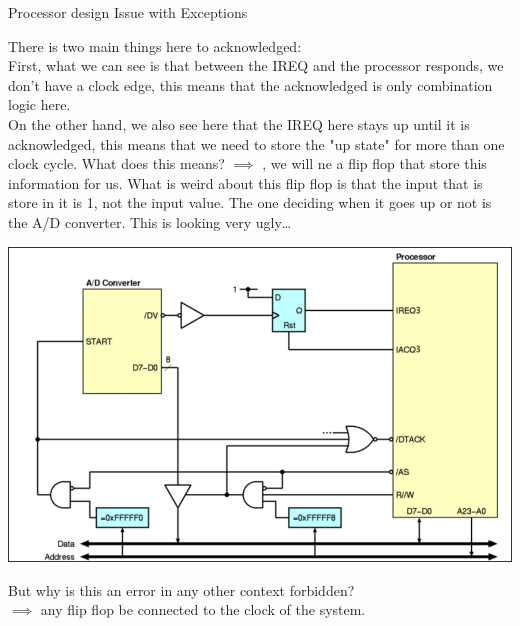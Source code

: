 \begin{parag}{Processor design Issue with Exceptions}
\begin{center}
\end{center}
There is two main things here to acknowledged:\\
First, what we can see is that between the IREQ and the processor responds, we don't have a clock edge, this means that the acknowledged is only combination logic here.\\
On the other hand, we also see here that the IREQ here stays up until it is acknowledged, this means that we need to store the "up state"  for more than one clock cycle. What does this means? $\implies $ , we will ne a flip flop that store this information for us. What is weird about this flip flop is that the input that is store in it is 1, not the input value. The one deciding when it goes up or not is the A/D converter. This is looking very ugly\ldots 
\begin{center}
\includegraphics[scale=0.3]{screenshots/2025-10-17_2.png}
\end{center}
But why is this an error in any other context forbidden?\\
$\implies $ any flip flop  be connected to the clock of the system.

\end{parag}

